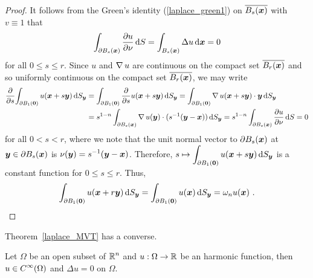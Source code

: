 \begin{proof}
It follows from the Green's identity (\ref{laplace_green1}) on
$\DS \overline{B_s(\VEC{x})}$ with $v \equiv 1$ that
\begin{equation} \label{MVTequ1}
\int_{\partial B_s(\VEC{x})} \pdydx{u}{\nu} \dx{S}
= \int_{B_s(\VEC{x})} \Delta u \dx{\VEC{x}} = 0
\end{equation}
for all $0 \leq s \leq r$.  Since $u$ and
$\graD u$ are continuous on the compact set
$\overline{B_r(\VEC{x})}$ and so uniformly continuous on the compact
set $\overline{B_r(\VEC{x})}$, we may write
\begin{align*}
\pdfdx{ \int_{\partial B_1(\VEC{0})} u(\VEC{x} + s\VEC{y}) \dss{S}{y} }{s}
&= \int_{\partial B_1(\VEC{0})} \pdfdx{u(\VEC{x} + s\VEC{y})}{s} \dss{S}{y}
= \int_{\partial B_1(\VEC{0})} \graD u(\VEC{x} + s\VEC{y}) \cdot
\VEC{y} \dss{S}{y} \\
& = s^{1-n}\int_{\partial B_s(\VEC{x})} \graD u(\VEC{y}) \cdot
(s^{-1}(\VEC{y}-\VEC{x})) \dss{S}{y}
= s^{1-n} \int_{\partial B_s(\VEC{x})}
\pdydx{u}{\nu} \dx{S} = 0
\end{align*}
for all $0<s<r$, where we note that the unit normal vector to
$\partial B_s(\VEC{x})$ at $\VEC{y} \in \partial B_s(\VEC{x})$ is
$\DS \nu(\VEC{y}) = s^{-1}(\VEC{y}-\VEC{x})$.
Therefore,
$\DS s \mapsto
\int_{\partial B_1(\VEC{0})} u(\VEC{x} + s\VEC{y}) \dss{S}{y}$
is a constant function for $0 \leq s \leq r$.  Thus,
\[
\int_{\partial B_1(\VEC{0})} u(\VEC{x} + r\VEC{y}) \dss{S}{y}
= \int_{\partial B_1(\VEC{0})} u(\VEC{x}) \dss{S}{y}
= \omega_n u(\VEC{x}) \ . \qedhere
\]
\end{proof}

Theorem~\ref{laplace_MVT} has a converse.

\begin{theorem} \label{laplace_MVT_conv}
Let $\Omega$ be an open subset of $\DS \RR^n$ and
$u:\Omega \rightarrow \RR$ be an harmonic function, then
$\DS u \in C^\infty(\Omega)$ and $\Delta u = 0$ on $\Omega$.
\end{theorem}

